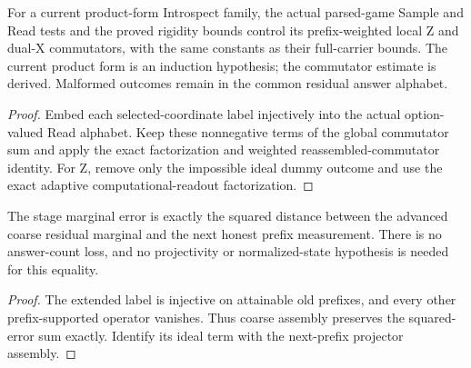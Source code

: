 \begin{lemma}
\label{lem:intro-adaptive-read-error}
\leanok
For a current product-form Introspect family, the actual parsed-game Sample
and Read tests and the proved rigidity bounds control its prefix-weighted
local Z and dual-X commutators, with the same constants as their full-carrier bounds.
The current product form is an induction hypothesis; the commutator estimate
is derived. Malformed outcomes remain in the common residual answer alphabet.
\end{lemma}
\begin{proof}
\leanok
Embed each selected-coordinate label injectively into the actual option-valued
Read alphabet. Keep these nonnegative terms of the global commutator sum and
apply the exact factorization and weighted reassembled-commutator identity.
For Z, remove only the impossible ideal dummy outcome and use the exact
adaptive computational-readout factorization.
\end{proof}

\begin{lemma}
\label{lem:intro-adaptive-marginal}
\leanok
The stage marginal error is exactly the squared distance between the
advanced coarse residual marginal and the next honest prefix measurement.
There is no answer-count loss, and no projectivity or normalized-state
hypothesis is needed for this equality.
\end{lemma}
\begin{proof}
\leanok
The extended label is injective on attainable old prefixes, and every
other prefix-supported operator vanishes. Thus coarse assembly preserves
the squared-error sum exactly. Identify its ideal term with the next-prefix
projector assembly.
\end{proof}


